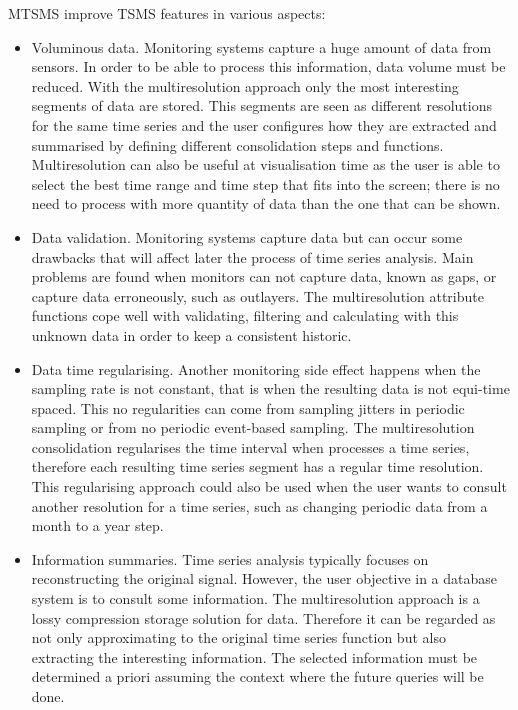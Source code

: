 MTSMS improve TSMS features in various aspects:
\begin{itemize}

\item Voluminous data. Monitoring systems capture a huge amount of
  data from sensors. In order to be able to process this information,
  data volume must be reduced. With the multiresolution approach only
  the most interesting segments of data are stored. This segments are
  seen as different resolutions for the same time series and the user
  configures how they are extracted and summarised by defining
  different consolidation steps and functions. Multiresolution can
  also be useful at visualisation time as the user is able to select
  the best time range and time step that fits into the screen; there
  is no need to process with more quantity of data than the one that
  can be shown.

\item Data validation. Monitoring systems capture data but can occur
  some drawbacks that will affect later the process of time series
  analysis. Main problems are found when monitors can not capture
  data, known as gaps, or capture data erroneously, such as outlayers.
  The multiresolution attribute functions cope well with validating,
  filtering and calculating with this unknown data in order to keep a
  consistent historic.

\item Data time regularising. Another monitoring side effect happens when
  the sampling rate is not constant, that is when the resulting data
  is not equi-time spaced. This no regularities can come from sampling
  jitters in periodic sampling or from no periodic event-based
  sampling. The multiresolution consolidation regularises the time
  interval when processes a time series, therefore each resulting time
  series segment has a regular time resolution. This regularising
  approach could also be used when the user wants to consult another
  resolution for a time series, such as changing periodic data from a
  month to a year step.

\item Information summaries. Time series analysis typically focuses on
  reconstructing the original signal. However, the user objective in a
  database system is to consult some information. The multiresolution
  approach is a lossy compression storage solution for data. Therefore
  it can be regarded as not only approximating to the
  original time series function but also extracting the interesting
  information. The selected information must be determined a priori
  assuming the context where the future queries will be done.

\end{itemize}





